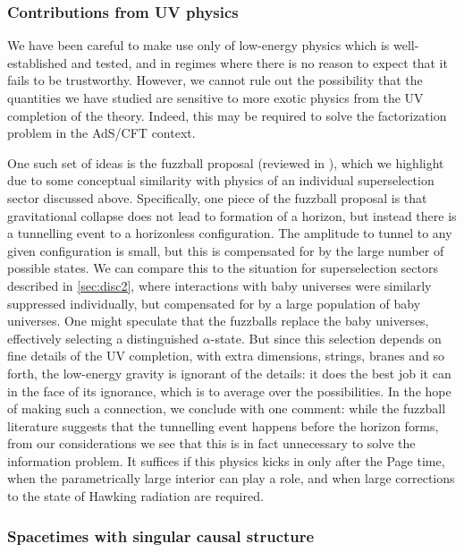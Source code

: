 \documentclass[letterpaper,12pt]{article}
\begin{document}
\subsubsection{Contributions from UV physics}

We have been careful to make use only of low-energy physics which is well-established and tested, and in regimes where there is no reason to expect that it fails to be trustworthy. However, we cannot rule out the possibility that the quantities we have studied are sensitive to more exotic physics from the UV completion of the theory. Indeed, this may be required to solve the factorization problem in the AdS/CFT context.

One such set of ideas is the fuzzball proposal (reviewed in \cite{Mathur:2005zp,Bena:2013dka}), which we highlight due to some conceptual similarity with physics of an individual superselection sector discussed above. Specifically, one piece of the fuzzball proposal is that gravitational collapse does not lead to formation of a horizon, but instead there is a tunnelling event to a horizonless configuration. The amplitude to tunnel to any given configuration is small, but this is compensated for by the large number of possible states. We can compare this to the situation for superselection sectors described in \ref{sec:disc2}, where interactions with baby universes were similarly suppressed individually, but compensated for by a large population of baby universes. One might speculate that the fuzzballs replace the baby universes, effectively selecting a distinguished $\alpha$-state. But since this selection depends on fine details of the UV completion, with extra dimensions, strings, branes and so forth, the low-energy gravity is ignorant of the details: it does the best job it can in the face of its ignorance, which is to average over the possibilities. In the hope of making such a connection, we conclude with one comment: while the fuzzball literature suggests that the tunnelling event happens before the horizon forms, from our considerations we see that this is in fact unnecessary to solve the information problem. It suffices if this physics kicks in only after the Page time, when the parametrically large interior can play a role, and when large corrections to the state of Hawking radiation are required.


\subsubsection{Spacetimes with singular causal structure}
\label{sec:SingCausal}
\end{document}
